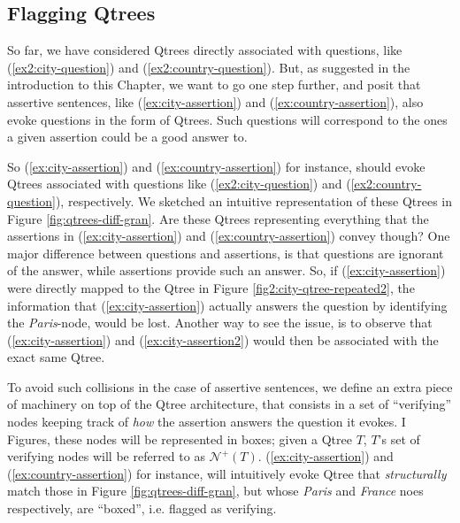 \subsection{Flagging Qtrees}

So far, we have considered Qtrees directly associated with questions, like (\ref{ex2:city-question}) and (\ref{ex2:country-question}). But, as suggested in the introduction to this Chapter, we want to go one step further, and posit that assertive sentences, like (\ref{ex:city-assertion}) and (\ref{ex:country-assertion}), also evoke questions in the form of Qtrees. Such questions will correspond to the ones a given assertion could be a good answer to.

\begin{exe}
	\ex \label{ex:city-country-assertions}
	\begin{xlist}
		\label{ex:city-assertion}
		\label{ex:country-assertion}
	\end{xlist}
\end{exe}

So (\ref{ex:city-assertion}) and (\ref{ex:country-assertion}) for instance, should evoke Qtrees associated with questions like (\ref{ex2:city-question}) and (\ref{ex2:country-question}), respectively. We sketched an intuitive representation of these Qtrees in Figure \ref{fig:qtrees-diff-gran}. Are these Qtrees representing everything that the assertions in (\ref{ex:city-assertion}) and (\ref{ex:country-assertion}) convey though? One major difference between questions and assertions, is that questions are ignorant of the answer, while assertions provide such an answer. So, if (\ref{ex:city-assertion}) were directly mapped to the Qtree in Figure \ref{fig2:city-qtree-repeated2}, the information that (\ref{ex:city-assertion}) actually answers the question by identifying the \textit{Paris}-node, would be lost. Another way to see the issue, is to observe that (\ref{ex:city-assertion}) and (\ref{ex:city-assertion2}) would then be associated with the exact same Qtree.

\begin{exe}
	\label{ex:city-assertion2}
\end{exe}

To avoid such collisions in the case of assertive sentences, we define an extra piece of machinery on top of the Qtree architecture, that consists in a set of ``verifying'' nodes keeping track of \textit{how} the assertion answers the question it evokes. I Figures, these nodes will be represented in boxes; given a Qtree $T$, $T$'s set of verifying nodes will be referred to as $\mathcal{N}^+(T)$. (\ref{ex:city-assertion}) and (\ref{ex:country-assertion}) for instance, will intuitively evoke Qtree that \textit{structurally} match those in Figure \ref{fig:qtrees-diff-gran}, but whose \textit{Paris} and \textit{France} noes respectively, are ``boxed'', i.e. flagged as verifying.

